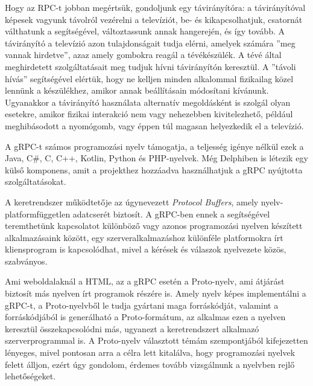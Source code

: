 \documentclass[tocnopagenum]{thesis-ekf}
\begin{document}
	Hogy az RPC-t jobban megértsük, gondoljunk egy távirányítóra: a távirányítóval képesek vagyunk távolról vezérelni a televíziót, be- és kikapcsolhatjuk, csatornát válthatunk a segítségével, változtassunk annak hangerején, és így tovább. A távirányító a televízió azon tulajdonságait tudja elérni, amelyek számára ''meg vannak hirdetve'', azaz amely gombokra reagál a tévékészülék. A tévé által meghirdetett szolgáltatásait meg tudjuk hívni távirányítón keresztül. A ''távoli hívás'' segítségével elértük, hogy ne kelljen minden alkalommal fizikailag közel lennünk a készülékhez, amikor annak beállításain módosítani kívánunk. Ugyanakkor a távirányító használata alternatív megoldásként is szolgál olyan esetekre, amikor fizikai interakció nem vagy nehezebben kivitelezhető, például meghibásodott a nyomógomb, vagy éppen túl magasan helyezkedik el a televízió.
	
	A gRPC-t számos programozási nyelv támogatja, a teljesség igénye nélkül ezek a Java, C\#, C, C++, Kotlin, Python és PHP-nyelvek. Még Delphiben is létezik egy külső komponens, amit a projekthez hozzáadva használhatjuk a gRPC nyújtotta szolgáltatásokat. \cite{grpc_delphi}
	
	A keretrendszer működtetője az úgynevezett \textit{Protocol Buffers}, amely nyelv- platformfüggetlen adatcserét biztosít. A gRPC-ben ennek a segítségével teremthetünk kapcsolatot különböző vagy azonos programozási nyelven készített alkalmazásaink között, egy szerveralkalmazáshoz különféle platformokra írt kliensprogram is kapcsolódhat, mivel a kérések és válaszok nyelvezete közös, szabványos. 
	
	Ami weboldalaknál a HTML, az a gRPC esetén a Proto-nyelv, ami átjárást biztosít más nyelven írt programok részére is. Amely nyelv képes implementálni a gRPC-t, a Proto-nyelvből le tudja gyártani maga forráskódját, valamint a forráskódjából is generálható a Proto-formátum, az alkalmas ezen a nyelven keresztül összekapcsolódni más, ugyanezt a keretrendszert alkalmazó szerverprogrammal is. A Proto-nyelv választott témám szempontjából kifejezetten lényeges, mivel pontosan arra a célra lett kitalálva, hogy programozási nyelvek felett álljon, ezért úgy gondolom, érdemes tovább vizsgálnunk a nyelvben rejlő lehetőségeket.
	
\end{document}
